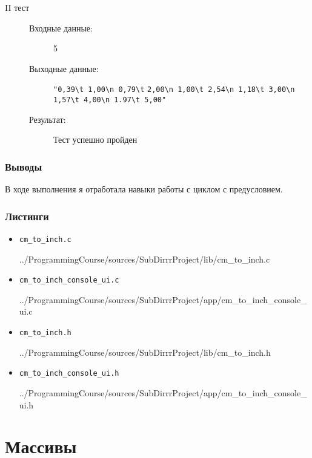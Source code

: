 \documentclass[12pt,a4paper]{report}
\begin{document}
\begin{enumerate}
\begin{description}
\item[II тест]
\hspace{\parindent}
\begin{flushleft}
\begin{description}
\item[Входные данные:] 5
\item[Выходные данные:] \verb/"0,39\t 1,00\n 0,79\t/
\verb/2,00\n 1,00\t 2,54\n 1,18\t 3,00\n 1,57\t 4,00\n 1.97\t 5,00"/ 
\item[Результат:] Тест успешно пройден
\end{description}
\end{flushleft}
\end{description}

\end{enumerate}
\subsection{Выводы}
\hspace{\parindent}
В ходе выполнения я отработала навыки работы с циклом с предусловием. 
\subsection*{Листинги}
\begin{itemize}
\item[] \verb-cm_to_inch.c-

{../ProgrammingCourse/sources/SubDirrrProject/lib/cm_to_inch.c}
\item[] \verb-cm_to_inch_console_ui.c-

{../ProgrammingCourse/sources/SubDirrrProject/app/cm_to_inch_console_ui.c}
\item[] \verb-cm_to_inch.h-

{../ProgrammingCourse/sources/SubDirrrProject/lib/cm_to_inch.h}
\item[] \verb-cm_to_inch_console_ui.h-

{../ProgrammingCourse/sources/SubDirrrProject/app/cm_to_inch_console_ui.h}
\end{itemize}

%
\chapter{Массивы}
\end{document}
